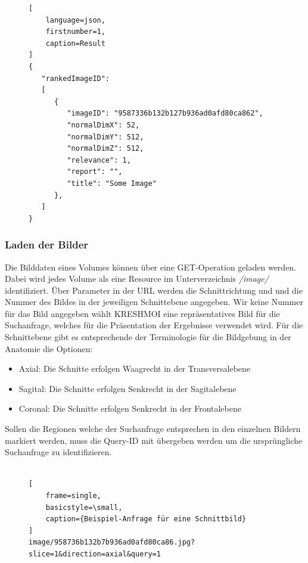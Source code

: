 \begin{figure}[t]
\begin{lstlisting}[
	language=json,
	firstnumber=1,
	caption=Result
]
{
   "rankedImageID": 
   [
      {
         "imageID": "9587336b132b127b936ad0afd80ca862",
         "normalDimX": 52,
         "normalDimY": 512,
         "normalDimZ": 512,
         "relevance": 1,
         "report": "",
         "title": "Some Image"
      },
   ]
}
\end{lstlisting}
\end{figure}

\subsubsection{Laden der Bilder}
\label{sec:Laden der Bilder}
Die Bilddaten eines Volumes können über eine GET-Operation geladen werden.
Dabei wird jedes Volume als eine Resource im Unterverzeichnis \textit{/image/} identifiziert.
Über Parameter in der URL werden die Schnittrichtung und und die Nummer des Bildes in der jeweiligen Schnittebene angegeben.
Wir keine Nummer für das Bild angegeben wählt KRESHMOI eine repräsentatives Bild für die Suchanfrage, welches für die Präsentation der Ergebnisse verwendet wird.
Für die Schnittebene gibt es entsprechende der Terminologie für die Bildgebung in der Anatomie die Optionen:
\begin{itemize}
	\item Axial: Die Schnitte erfolgen Waagrecht in der Transversalebene
	\item Sagital: Die Schnitte erfolgen Senkrecht in der Sagitalebene
	\item Coronal: Die Schnitte erfolgen Senkrecht in der Frontalebene 
\end{itemize}
Sollen die Regionen welche der Suchanfrage entsprechen in den einzelnen Bildern markiert werden, muss die Query-ID mit übergeben werden um die ursprüngliche Suchanfrage zu identifizieren.
\\
\\
\begin{figure}[t]
\begin{lstlisting}[
	frame=single,
	basicstyle=\small,
	caption={Beispiel-Anfrage für eine Schnittbild}
]
image/958736b132b7b936ad0afd80ca86.jpg?slice=1&direction=axial&query=1
\end{lstlisting}
\end{figure}

